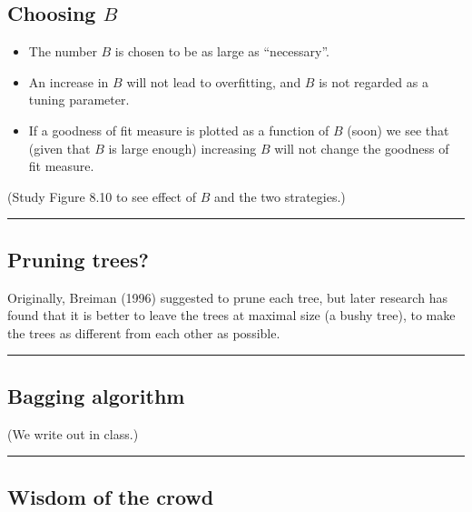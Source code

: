 \documentclass[
  letterpaper,
  DIV=11,
  numbers=noendperiod]{scrartcl}
\providecommand{\tightlist}{%
  \setlength{\itemsep}{0pt}\setlength{\parskip}{0pt}}\usepackage{longtable,booktabs,array}
\begin{document}
\hypertarget{choosing-b}{%
\subsection{\texorpdfstring{Choosing
\(B\)}{Choosing B}}\label{choosing-b}}

\begin{itemize}
\tightlist
\item
  The number \(B\) is chosen to be as large as ``necessary''.
\item
  An increase in \(B\) will not lead to overfitting, and \(B\) is not
  regarded as a tuning parameter.
\item
  If a goodness of fit measure is plotted as a function of \(B\) (soon)
  we see that (given that \(B\) is large enough) increasing \(B\) will
  not change the goodness of fit measure.
\end{itemize}

(Study Figure 8.10 to see effect of \(B\) and the two strategies.)

\begin{center}\rule{0.5\linewidth}{0.5pt}\end{center}

\hypertarget{pruning-trees}{%
\subsection{Pruning trees?}\label{pruning-trees}}

Originally, Breiman (1996) suggested to prune each tree, but later
research has found that it is better to leave the trees at maximal size
(a bushy tree), to make the trees as different from each other as
possible.

\begin{center}\rule{0.5\linewidth}{0.5pt}\end{center}

\hypertarget{bagging-algorithm}{%
\subsection{Bagging algorithm}\label{bagging-algorithm}}

(We write out in class.)

\begin{center}\rule{0.5\linewidth}{0.5pt}\end{center}

\hypertarget{wisdom-of-the-crowd}{%
\subsection{Wisdom of the crowd}\label{wisdom-of-the-crowd}}
\end{document}
